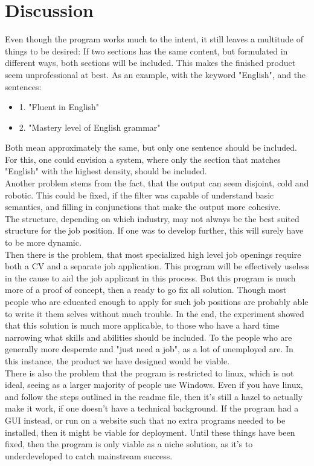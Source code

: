\section{Discussion}\label{sec:discussion}
Even though the program works much to the intent, it still leaves a multitude of things to be desired:
If two sections has the same content, but formulated in different ways, both sections will be included.
This makes the finished product seem unprofessional at best. As an example, with the keyword "English", and the sentences:
\begin{itemize}
  \item 1. "Fluent in English"
  \item 2. "Mastery level of English grammar"
\end{itemize}
Both mean approximately the same, but only one sentence should be included. For this, one could envision a system, 
where only the section that matches "English" with the highest density, should be included.\\

Another problem stems from the fact, that the output can seem disjoint, cold and robotic. 
This could be fixed, if the filter was capable of understand basic semantics, and filling in conjunctions that make the output more cohesive.\\

The structure, depending on which industry, may not always be the best suited structure for the job position. 
If one was to develop further, this will surely have to be more dynamic.\\

Then there is the problem, that most specialized high level job openings require both a CV and a separate job application. 
This program will be effectively useless in the cause to aid the job applicant in this process.
But this program is much more of a proof of concept, then a ready to go fix all solution.
Though most people who are educated enough to apply for such job positions are probably able to write it them selves without much trouble.
In the end, the experiment showed that this solution is much more applicable, to those who have a hard time narrowing what skills and abilities should be included.
To the people who are generally more desperate and "just need a job", as a lot of unemployed are.
In this instance, the product we have designed would be viable.\\

There is also the problem that the program is restricted to linux, which is not ideal, seeing as a larger majority of people use Windows.
Even if you have linux, and follow the steps outlined in the readme file, then it's still a hazel to actually make it work, if one doesn't have a technical background.
If the program had a GUI instead, or run on a website such that no extra programs needed to be installed, then it might be viable for deployment.
Until these things have been fixed, then the program is only viable as a niche solution, as it's to underdeveloped to catch mainstream success.

\clearpage
